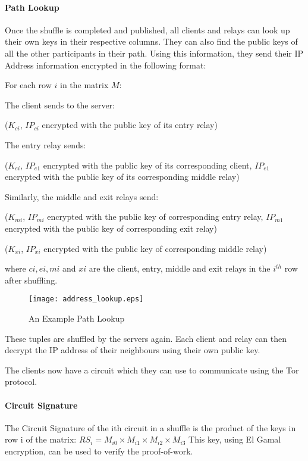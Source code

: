 \paragraph{Path Lookup}
Once the shuffle is completed and published, all clients and relays can look up
their own keys in their respective columns. They can also find the public keys 
of all the other participants in their path. Using this information, they send 
their IP Address information encrypted in the following format:

For each row $i$ in the matrix $M$:

The client sends to the server:

($K_{ci}$, {$IP_{ci}$ encrypted with the public key of its entry relay})

The entry relay sends:

($K_{ei}$, {$IP_{e1}$ encrypted with the public key of its corresponding client}, 
{$IP_{e1}$ encrypted with the public key of its corresponding middle relay})

Similarly, the middle and exit relays send:

($K_{mi}$, {$IP_{mi}$ encrypted with the public key of corresponding entry relay}, 
{$IP_{m1}$ encrypted with the public key of corresponding exit relay})

($K_{xi}$, {$IP_{xi}$ encrypted with the public key of corresponding middle relay})

where $ci, ei, mi$ and $xi$ are the client, entry, middle and exit relays in the $i^{th}$
row after shuffling.

\begin{figure}
\centering
\texttt{[image: address\_lookup.eps]}
\caption{An Example Path Lookup}
\end{figure}

These tuples are shuffled by the servers again. Each client and relay can then 
decrypt the IP address of their neighbours using their own public key.

The clients now have a circuit which they can use to communicate using the Tor 
protocol.

\paragraph{Circuit Signature}
The Circuit Signature of the ith circuit in a shuffle is the product of the keys
in row i of the matrix:
$RS_i = M_{i0} \times M_{i1} \times M_{i2} \times M_{i3}$
This key, using El Gamal encryption, can be used to verify the proof-of-work.

